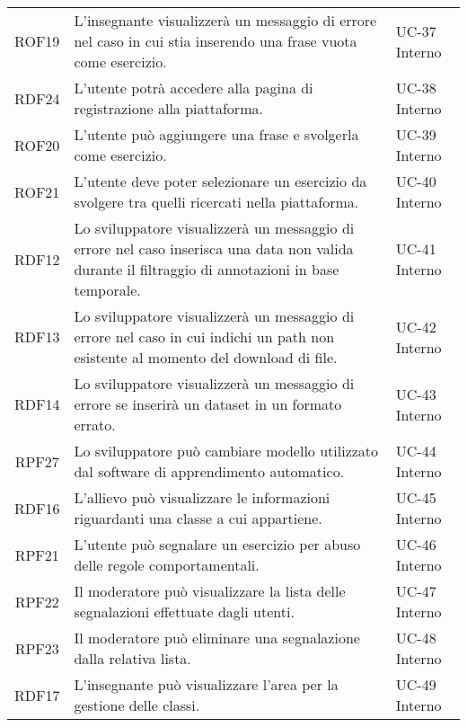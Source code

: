\begin{tabularx}{\textwidth}{| c | p{10cm} | X |}
		ROF19 & L'insegnante visualizzerà un messaggio di errore nel caso in cui stia inserendo una frase vuota come esercizio. & UC-37 \newline Interno\\
		RDF24 & L'utente potrà accedere alla pagina di registrazione alla piattaforma. & UC-38 \newline Interno\\
		ROF20 & L'utente può aggiungere una frase e svolgerla come esercizio. & UC-39 \newline Interno\\
		ROF21 & L'utente deve poter selezionare un esercizio da svolgere tra quelli ricercati nella piattaforma. & UC-40 \newline Interno\\
		RDF12 & Lo sviluppatore visualizzerà un messaggio di errore nel caso inserisca una data non valida durante il filtraggio di annotazioni in base temporale. & UC-41 \newline Interno\\
		RDF13 & Lo sviluppatore visualizzerà un messaggio di errore nel caso in cui indichi un path non esistente al momento del download di file. & UC-42 \newline Interno\\
		RDF14 & Lo sviluppatore visualizzerà un messaggio di errore se inserirà un dataset in un formato errato. & UC-43 \newline Interno\\
		RPF27 & Lo sviluppatore può cambiare modello utilizzato dal software di apprendimento automatico. & UC-44 \newline Interno\\
		RDF16 & L'allievo può visualizzare le informazioni riguardanti una classe a cui appartiene. & UC-45 \newline Interno\\
		RPF21 & L'utente può segnalare un esercizio per abuso delle regole comportamentali. & UC-46 \newline Interno\\
		RPF22 & Il moderatore può visualizzare la lista delle segnalazioni effettuate dagli utenti. & UC-47 \newline Interno\\
		RPF23 & Il moderatore può eliminare una segnalazione dalla relativa lista. & UC-48 \newline Interno\\
		RDF17 & L'insegnante può visualizzare l'area per la gestione delle classi. & UC-49 \newline Interno\\

\end{tabularx}

